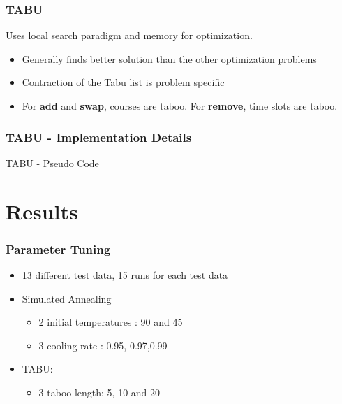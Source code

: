 \documentclass{beamer}
\makeatletter
\newenvironment{algorithm}[1][]{%
  \def\@captype{algorithm}%
  \par\nobreak\begin{center}\nobreak}
  {\par\nobreak\end{center}\nobreak}
\newcounter{algorithm}
\makeatother
\begin{document}
\begin{frame}
\frametitle{TABU}
Uses local search paradigm and memory for optimization.
\begin{itemize}
\item Generally finds better solution than the other optimization problems
\item Contraction of the Tabu list is problem specific
\item For \textbf{add} and \textbf{swap}, courses are taboo. For \textbf{remove}, time slots are taboo.
\end{itemize}
\end{frame}

\begin{frame}[shrink=20]
\frametitle{TABU  - Implementation Details}
\begin{algorithm}[H]
\begin{algorithmic}[1]
\REPEAT
{}
\ENDIF
{}
\ENDIF
{}
\end{algorithmic}
\caption{TABU - Pseudo Code}
\label{alg:seq}
\end{algorithm}
\end{frame}

\section{Results}

\begin{frame}
\frametitle{Parameter Tuning}
\begin{itemize}
\item 13 different test data, 15 runs for each test data
\item Simulated Annealing 
\begin{itemize}
\item 2 initial temperatures : 90 and 45
\item  3 cooling rate : 0.95, 	0.97,0.99
\end{itemize}
\item TABU: 
\begin{itemize}
\item 3 taboo length: 5, 10 and 20
\end{itemize}
\end{itemize}

\end{frame}
\end{document}
